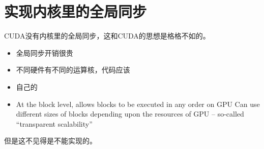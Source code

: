 \chapter{实现内核里的全局同步}

CUDA没有内核里的全局同步，这和CUDA的思想是格格不如的。
\begin{itemize}
\item 全局同步开销很贵
\item 不同硬件有不同的运算核，代码应该
\item 自己的
\item At the block level, allows blocks to be executed in any order on GPU
Can use different sizes of blocks depending upon the resources of GPU – so-called “transparent scalability”
\end{itemize}

但是这不见得是不能实现的。\cite{conf/ipps/XiaoF10}

